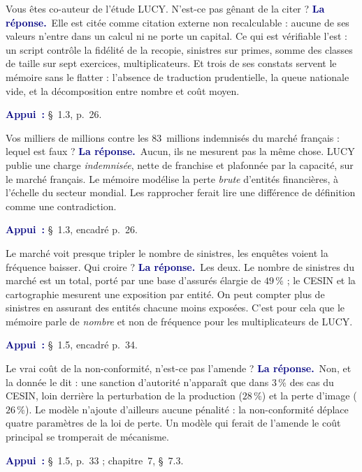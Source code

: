 \documentclass[11pt,a4paper]{article}
\newcommand{\rep}[1]{\smallskip\noindent\textcolor{navy}{\textbf{La réponse.}}\ #1\par}
\newcommand{\appui}[1]{\smallskip\noindent\small\textcolor{navy}{\textbf{Appui~:}} #1\par\normalsize}
\begin{document}
\begin{question}{\og Vous êtes co-auteur de l'étude LUCY. N'est-ce pas gênant de la citer ?\fg{}}
\rep{Elle est citée comme citation externe non recalculable : aucune de ses valeurs n'entre dans
un calcul ni ne porte un capital. Ce qui est vérifiable l'est : un script contrôle la fidélité de
la recopie, sinistres sur primes, somme des classes de taille sur sept exercices, multiplicateurs.
Et trois de ses constats servent le mémoire sans le flatter : l'absence de traduction
prudentielle, la queue nationale vide, et la décomposition entre nombre et coût moyen.}
\appui{\S~1.3, p.~26.}
\end{question}

\begin{question}{\og Vos milliers de millions contre les $83$~millions indemnisés du marché français : lequel est faux ?\fg{}}
\rep{Aucun, ils ne mesurent pas la même chose. LUCY publie une charge \emph{indemnisée}, nette de
franchise et plafonnée par la capacité, sur le marché français. Le mémoire modélise la perte
\emph{brute} d'entités financières, à l'échelle du secteur mondial. Les rapprocher ferait lire
une différence de définition comme une contradiction.}
\appui{\S~1.3, encadré p.~26.}
\end{question}

\begin{question}{\og Le marché voit presque tripler le nombre de sinistres, les enquêtes voient la fréquence baisser. Qui croire ?\fg{}}
\rep{Les deux. Le nombre de sinistres du marché est un total, porté par une base d'assurés
élargie de $49\,\%$ ; le CESIN et la cartographie mesurent une exposition par entité. On peut
compter plus de sinistres en assurant des entités chacune moins exposées. C'est pour cela que le
mémoire parle de \emph{nombre} et non de fréquence pour les multiplicateurs de LUCY.}
\appui{\S~1.5, encadré p.~34.}
\end{question}

\begin{question}{\og Le vrai coût de la non-conformité, n'est-ce pas l'amende ?\fg{}}
\rep{Non, et la donnée le dit : une sanction d'autorité n'apparaît que dans $3\,\%$ des cas du
CESIN, loin derrière la perturbation de la production ($28\,\%$) et la perte d'image ($26\,\%$).
Le modèle n'ajoute d'ailleurs aucune pénalité : la non-conformité déplace quatre paramètres de la
loi de perte. Un modèle qui ferait de l'amende le coût principal se tromperait de mécanisme.}
\appui{\S~1.5, p.~33 ; chapitre~7, \S~7.3.}
\end{question}
\end{document}
